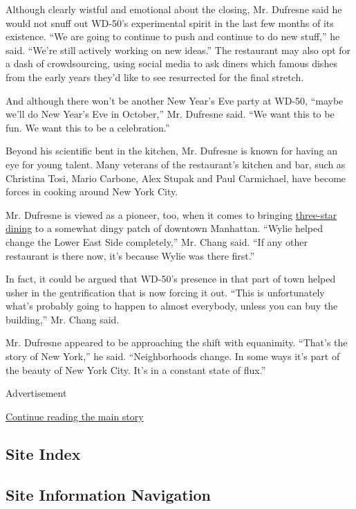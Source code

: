 Although clearly wistful and emotional about the closing, Mr. Dufresne
said he would not snuff out WD-50's experimental spirit in the last few
months of its existence. ``We are going to continue to push and continue
to do new stuff,'' he said. ``We're still actively working on new
ideas.'' The restaurant may also opt for a dash of crowdsourcing, using
social media to ask diners which famous dishes from the early years
they'd like to see resurrected for the final stretch.

And although there won't be another New Year's Eve party at WD-50,
``maybe we'll do New Year's Eve in October,'' Mr. Dufresne said. ``We
want this to be fun. We want this to be a celebration.''

Beyond his scientific bent in the kitchen, Mr. Dufresne is known for
having an eye for young talent. Many veterans of the restaurant's
kitchen and bar, such as Christina Tosi, Mario Carbone, Alex Stupak and
Paul Carmichael, have become forces in cooking around New York City.

Mr. Dufresne is viewed as a pioneer, too, when it comes to bringing
\href{http://www.nytimes3xbfgragh.onion/2008/03/05/dining/reviews/05rest.html?pagewanted=all}{three-star
dining} to a somewhat dingy patch of downtown Manhattan. ``Wylie helped
change the Lower East Side completely,'' Mr. Chang said. ``If any other
restaurant is there now, it's because Wylie was there first.''

In fact, it could be argued that WD-50's presence in that part of town
helped usher in the gentrification that is now forcing it out. ``This is
unfortunately what's probably going to happen to almost everybody,
unless you can buy the building,'' Mr. Chang said.

Mr. Dufresne appeared to be approaching the shift with equanimity.
``That's the story of New York,'' he said. ``Neighborhoods change. In
some ways it's part of the beauty of New York City. It's in a constant
state of flux.''

Advertisement

\protect\hyperlink{after-bottom}{Continue reading the main story}

\hypertarget{site-index}{%
\subsection{Site Index}\label{site-index}}

\hypertarget{site-information-navigation}{%
\subsection{Site Information
Navigation}\label{site-information-navigation}}

